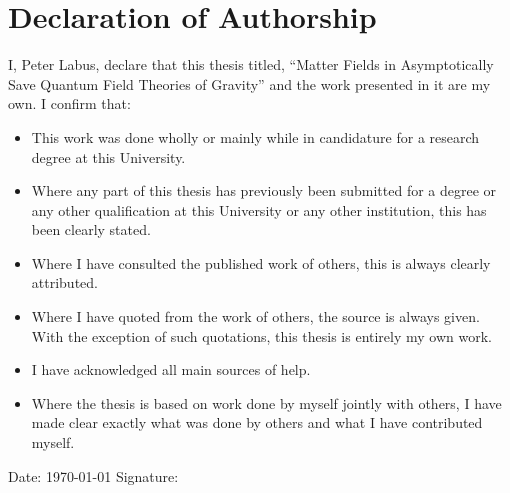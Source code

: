 \documentclass[11pt]{book} %
\numberwithin{equation}{chapter}
\begin{document}

\chapter*{Declaration of Authorship}

\noindent I, Peter Labus, declare that this thesis titled,
``Matter Fields in Asymptotically Save Quantum Field Theories of Gravity''
and the work presented in it are my own. I confirm that:
\vfill

\begin{itemize}
\item This work was done wholly or mainly while in candidature for a research degree at this University.
\vfill
\item Where any part of this thesis has previously been submitted for a degree or any other qualification at this University or any other institution, this has been clearly stated.
\vfill
\item Where I have consulted the published work of others, this is always clearly attributed.
\vfill
\item Where I have quoted from the work of others, the source is always given. With the exception of such quotations, this thesis is entirely my own work.
\vfill
\item I have acknowledged all main sources of help.
\vfill
\item Where the thesis is based on work done by myself jointly with others, I have made clear exactly what was done by others and what I have contributed myself.\\
\end{itemize}
\vfill

\noindent Date: \dateall\today%
\hspace{4cm} Signature:\\
\end{document}
